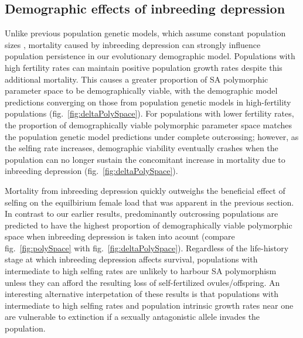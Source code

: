 \documentclass[11pt]{article}
\begin{document}
\subsection*{Demographic effects of inbreeding depression} \label{subsec:InbreedEffects}

Unlike previous population genetic models, which assume constant population sizes \citep{JordanConnallon2014,Olito2017}, mortality caused by inbreeding depression can strongly influence population persistence in our evolutionary demographic model. Populations with high fertility rates can maintain positive population growth rates despite this additional mortality. This causes a greater proportion of SA polymorphic parameter space to be demographically viable, with the demographic model predictions converging on those from population genetic models in high-fertility populations (fig.~\ref{fig:deltaPolySpace}). For populations with lower fertility rates, the proportion of demographically viable polymorphic parameter space matches the population genetic model predictions under complete outcrossing; however, as the selfing rate increases, demographic viability eventually crashes when the population can no longer sustain the concomitant increase in mortality due to inbreeding depression (fig.~\ref{fig:deltaPolySpace}). 

Mortality from inbreeding depression quickly outweighs the beneficial effect of selfing on the equilbirium female load that was apparent in the previous section. In contrast to our earlier results, predominantly outcrossing populations are predicted to have the highest proportion of demographically viable polymorphic space when inbreeding depression is taken into acount (compare fig.~\ref{fig:polySpace} with fig.~\ref{fig:deltaPolySpace}). Regardless of the life-history stage at which inbreeding depression affects survival, populations with intermediate to high selfing rates are unlikely to harbour SA polymorphism unless they can afford the resulting loss of self-fertilized ovules/offspring. An interesting alternative interpetation of these results is that populations with intermediate to high selfing rates and population intrinsic growth rates near one are vulnerable to extinction if a sexually antagonistic allele invades the population.
\end{document}

